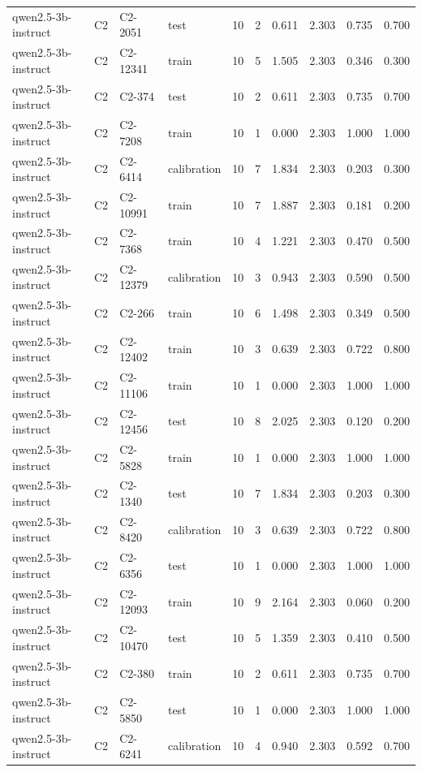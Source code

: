 \begin{table}
\begin{tabular}{llllrrrrrr}
qwen2.5-3b-instruct & C2 & C2-2051 & test & 10 & 2 & 0.611 & 2.303 & 0.735 & 0.700 \\
qwen2.5-3b-instruct & C2 & C2-12341 & train & 10 & 5 & 1.505 & 2.303 & 0.346 & 0.300 \\
qwen2.5-3b-instruct & C2 & C2-374 & test & 10 & 2 & 0.611 & 2.303 & 0.735 & 0.700 \\
qwen2.5-3b-instruct & C2 & C2-7208 & train & 10 & 1 & 0.000 & 2.303 & 1.000 & 1.000 \\
qwen2.5-3b-instruct & C2 & C2-6414 & calibration & 10 & 7 & 1.834 & 2.303 & 0.203 & 0.300 \\
qwen2.5-3b-instruct & C2 & C2-10991 & train & 10 & 7 & 1.887 & 2.303 & 0.181 & 0.200 \\
qwen2.5-3b-instruct & C2 & C2-7368 & train & 10 & 4 & 1.221 & 2.303 & 0.470 & 0.500 \\
qwen2.5-3b-instruct & C2 & C2-12379 & calibration & 10 & 3 & 0.943 & 2.303 & 0.590 & 0.500 \\
qwen2.5-3b-instruct & C2 & C2-266 & train & 10 & 6 & 1.498 & 2.303 & 0.349 & 0.500 \\
qwen2.5-3b-instruct & C2 & C2-12402 & train & 10 & 3 & 0.639 & 2.303 & 0.722 & 0.800 \\
qwen2.5-3b-instruct & C2 & C2-11106 & train & 10 & 1 & 0.000 & 2.303 & 1.000 & 1.000 \\
qwen2.5-3b-instruct & C2 & C2-12456 & test & 10 & 8 & 2.025 & 2.303 & 0.120 & 0.200 \\
qwen2.5-3b-instruct & C2 & C2-5828 & train & 10 & 1 & 0.000 & 2.303 & 1.000 & 1.000 \\
qwen2.5-3b-instruct & C2 & C2-1340 & test & 10 & 7 & 1.834 & 2.303 & 0.203 & 0.300 \\
qwen2.5-3b-instruct & C2 & C2-8420 & calibration & 10 & 3 & 0.639 & 2.303 & 0.722 & 0.800 \\
qwen2.5-3b-instruct & C2 & C2-6356 & test & 10 & 1 & 0.000 & 2.303 & 1.000 & 1.000 \\
qwen2.5-3b-instruct & C2 & C2-12093 & train & 10 & 9 & 2.164 & 2.303 & 0.060 & 0.200 \\
qwen2.5-3b-instruct & C2 & C2-10470 & test & 10 & 5 & 1.359 & 2.303 & 0.410 & 0.500 \\
qwen2.5-3b-instruct & C2 & C2-380 & train & 10 & 2 & 0.611 & 2.303 & 0.735 & 0.700 \\
qwen2.5-3b-instruct & C2 & C2-5850 & test & 10 & 1 & 0.000 & 2.303 & 1.000 & 1.000 \\
qwen2.5-3b-instruct & C2 & C2-6241 & calibration & 10 & 4 & 0.940 & 2.303 & 0.592 & 0.700 \\

\end{tabular}
\end{table}
